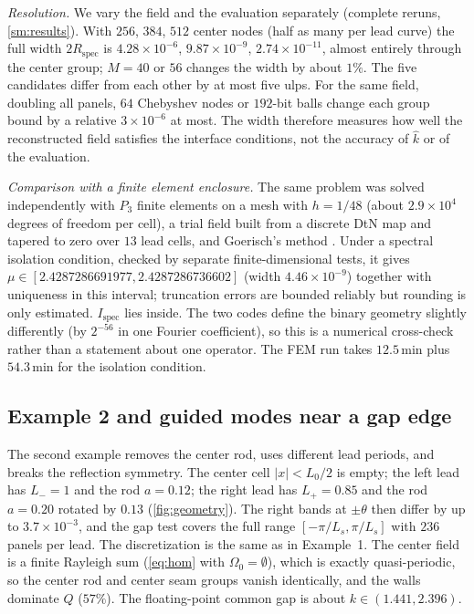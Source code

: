 \emph{Resolution.} We vary the field and the evaluation separately (complete
reruns, \cref{sm:results}). With $256$, $384$, $512$ center nodes (half as many per
lead curve) the full width $2R_{\mathrm{spec}}$ is $4.28\times10^{-6}$,
$9.87\times10^{-9}$, $2.74\times10^{-11}$, almost entirely through the center group;
$M=40$ or $56$ changes the width by about $1\%$. The five candidates differ from
each other by at most five ulps. For the same field, doubling all panels,
$64$ Chebyshev nodes or $192$-bit balls change each group bound by a relative
$3\times10^{-6}$ at most. The width therefore measures how well the reconstructed
field satisfies the interface conditions, not the accuracy of $\widehat k$ or of
the evaluation.

\emph{Comparison with a finite element enclosure.} The same problem was solved
independently with $P_3$ finite elements on a mesh with $h=1/48$ (about
$2.9\times10^4$ degrees of freedom per cell), a trial field built from a discrete
DtN map and tapered to zero over $13$ lead cells, and Goerisch's method
. Under a spectral isolation condition, checked by separate
finite-dimensional tests, it gives $\mu\in[2.4287286691977,2.4287286736602]$ (width
$4.46\times10^{-9}$) together with uniqueness in this interval; truncation errors
are bounded reliably but rounding is only estimated. $I_{\mathrm{spec}}$ lies
inside. The two codes define the binary geometry slightly differently (by
$2^{-56}$ in one Fourier coefficient), so this is a numerical cross-check rather
than a statement about one operator. The FEM run takes $12.5$\,min plus
$54.3$\,min for the isolation condition.

\subsection{Example 2 and guided modes near a gap edge}\label{sec:ex2}
The second example removes the center rod, uses different lead periods, and
breaks the reflection symmetry. The center cell $|x|<L_0/2$ is empty; the left
lead has $L_-=1$ and the rod $a=0.12$; the right lead has $L_+=0.85$ and the rod
$a=0.20$ rotated by $0.13$ (\cref{fig:geometry}). The right bands at $\pm\theta$
then differ by up to $3.7\times10^{-3}$, and the gap test covers the full range
$[-\pi/L_s,\pi/L_s]$ with $236$ panels per lead. The discretization is the same
as in Example~1. The center field is a finite Rayleigh sum (\eqref{eq:hom} with
$\Omega_0=\emptyset$), which is exactly quasi-periodic, so the center rod and
center seam groups vanish identically, and the walls dominate $Q$ ($57\%$). The
floating-point common gap is about $k\in(1.441,2.396)$.


